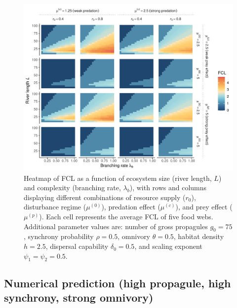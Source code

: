 \begin{figure}
\centering
\includegraphics{../data_fmt/fig_rho05_g75_theta05.pdf}
\caption{Heatmap of FCL as a function of ecosystem size (river length,
\(L\)) and complexity (branching rate, \(\lambda_b\)), with rows and
columns displaying different combinations of resource supply (\(r_0\)),
disturbance regime (\(\mu^{(0)}\)), predation effect (\(\mu^{(c)}\)),
and prey effect (\(\mu^{(p)}\)). Each cell represents the average FCL of
five food webs. Additional parameter values are: number of gross
propagules \(g_0=75\), synchrony probability \(\rho=0.5\), omnivory
\(\theta=0.5\), habitat density \(h=2.5\), dispersal capability
\(\delta_0=0.5\), and scaling exponent \(\psi_1=\psi_2=0.5\).}
\end{figure}

\newpage

\subsection*{Numerical prediction (high propagule, high synchrony,
strong
omnivory)}\label{numerical-prediction-high-propagule-high-synchrony-strong-omnivory}

